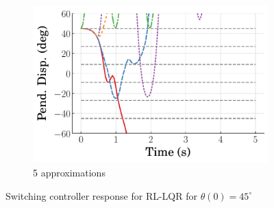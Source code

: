 \begin{figure}
\begin{subfigure}[b]{0.32\textwidth}
    \end{subfigure}
    \hfill
    \begin{subfigure}[b]{0.32\textwidth}
        \centering
        \includegraphics[width=\textwidth]{figures/figures_Interpretability/Mean_ISE_Inverted_Pendulum-v0_cubic_5_bins_near_equil/Curve_fit_time_responses/lumped_lqr/curve_fit_Pend_Disp_45.pdf}
        \caption{5 approximations}
        \label{subfig_chap5:lumped_LQR_near_equil_5_bins_resp_unclipped}
    \end{subfigure}
    \caption{Switching controller response for RL-LQR for $\theta(0)=45^\circ$}
    \label{fig_chap5:lumped_LQR_near_equil_45_resp_unclipped}
\end{figure}
%

